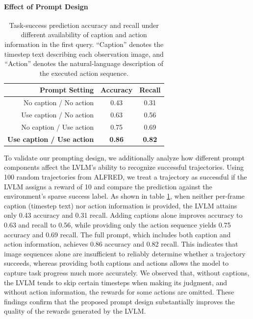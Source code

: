 \documentclass[master,english,final]{kaist-ucs}
\begin{document}
\paragraph{Effect of Prompt Design}
\begin{table}[h]
    \centering
    \setlength{\tabcolsep}{22pt}   %
    \renewcommand{\arraystretch}{1.0} %

    \begin{tabularx}{0.7\textwidth}{@{}rcc@{}}
        \toprule
        Prompt Setting                      & Accuracy & Recall \\
        \midrule
        No caption / No action       & 0.43     & 0.31   \\
        Use caption / No action      & 0.63     & 0.56   \\
        No caption / Use action      & 0.75     & 0.69   \\
        \textbf{Use caption / Use action} & \textbf{0.86} & \textbf{0.82} \\
        \bottomrule
    \end{tabularx}
    \caption{Task-success prediction accuracy and recall under different availability of caption and action information in the first query. “Caption” denotes the timestep text describing each observation image, and “Action” denotes the natural-language description of the executed action sequence.}
    \label{tab:prompt_ablation}
\end{table}

To validate our prompting design, we additionally analyze how different prompt components affect the LVLM’s ability to recognize successful trajectories. Using 100 random trajectories from ALFRED, we treat a trajectory as successful if the LVLM assigns a reward of 10 and compare the prediction against the environment’s sparse success label. As shown in table \ref{tab:prompt_ablation}, when neither per-frame caption (timestep text) nor action information is provided, the LVLM attains only 0.43 accuracy and 0.31 recall. Adding captions alone improves accuracy to 0.63 and recall to 0.56, while providing only the action sequence yields 0.75 accuracy and 0.69 recall. The full prompt, which includes both caption and action information, achieves 0.86 accuracy and 0.82 recall. This indicates that image sequences alone are insufficient to reliably determine whether a trajectory succeeds, whereas providing both captions and actions allows the model to capture task progress much more accurately. We observed that, without captions, the LVLM tends to skip certain timesteps when making its judgment, and without action information, the rewards for some actions are omitted. These findings confirm that the proposed prompt design substantially improves the quality of the rewards generated by the LVLM.
\end{document}
